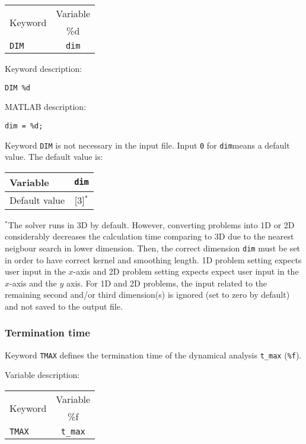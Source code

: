 \begin{tabular}{|l|c|}
\hline
\multirow{2}{*}{Keyword} & Variable \\ \cline{2-2}
& \%d \\ \hline
\texttt{DIM} & \texttt{dim} \\ \hline
\end{tabular}

Keyword description:

\begin{tcolorbox}
\texttt{DIM \%d}
\end{tcolorbox}

MATLAB description:

\begin{tcolorbox}
\texttt{dim = \%d;}
\end{tcolorbox}

Keyword \texttt{DIM} is not necessary in the input file. Input \texttt{0} for \texttt{dim}means a default value. The default value is:

\begin{tabular}{|l|c|}
\hline
Variable & \texttt{dim} \\ \hline
Default value & [3]$^*$ \\ \hline
\end{tabular}

$^*$The solver runs in 3D by default. However, converting problems into 1D or 2D considerably decreases the calculation time comparing to 3D due to the nearest neigbour search in lower dimension. Then, the correct dimension \texttt{dim} must be set in order to have correct kernel and smoothing length. 1D problem setting expects user input in the $x$-axis and 2D problem setting expects expect user input in the $x$-axis and the $y$ axis. For 1D and 2D problems, the input related to the remaining second and/or third dimension(s) is ignored (set to zero by default) and not saved to the output file.

\newpage


\subsubsection{Termination time}

Keyword \texttt{TMAX} defines the termination time of the dynamical analysis \texttt{t\_max} (\texttt{\%f}).

Variable description:

\begin{tabular}{|l|c|}
\hline
\multirow{2}{*}{Keyword} & Variable \\  \cline{2-2}
& \%f \\ \hline
\texttt{TMAX} & \texttt{t\_max} \\ \hline
\end{tabular}

